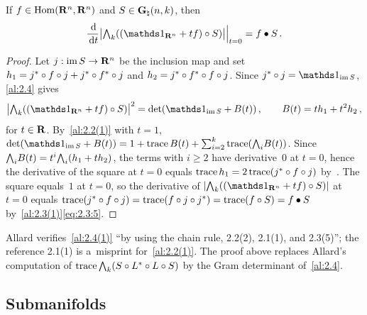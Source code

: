 \begin{lemma}
    \label{al:2.4(1)}
    If $f \in \operatorname{Hom}(\mathbf{R}^{n},\mathbf{R}^{n})$ and $S \in \mathbf{G}_{\natural}(n,k)$, then
    \begin{displaymath}
        \frac{\ud}{\ud t} \big| \extpower{\vdim} ((\id{\R^{\adim}} + t f) \circ S) \big|
        \Big|_{t=0} = f \bullet S \,.
    \end{displaymath}
\end{lemma}

\begin{proof}
    Let $j : \operatorname{im} S \to \mathbf{R}^{n}$ be the inclusion map and set $h_1 = j^{*} \circ f
    \circ j + j^{*} \circ f^{*} \circ j$ and $h_2 = j^{*} \circ
    f^{*} \circ f \circ j$. Since $\transpose{j} \circ j = \id{\im S}$,
    \ref{al:2.4} gives
    \begin{displaymath}
        \big| \extpower{\vdim}((\id{\R^{\adim}} + t f) \circ S) \big|^2 = \det(\id{\im S} + B(t))
        \,, \qquad B(t) = t h_1 + t^2 h_2 \,,
    \end{displaymath}
    for $t \in \mathbf{R}$. By~\ref{al:2.2(1)} with $t = 1$, $\det(\id{\im S} + B(t)) = 1 + \trace B(t) +
    \textsum{i=2}{\vdim} \trace(\extpower{i} B(t))$. Since ${\textstyle\boldsymbol{\bigwedge}}_{{i}} B(t) = t^i
    {\textstyle\boldsymbol{\bigwedge}}_{{i}}(h_1 + t h_2)$, the terms with $i \ge 2$ have derivative~$0$ at $t = 0$, hence
    the derivative of the square at $t = 0$ equals $\operatorname{trace} h_1 = 2 \operatorname{trace}(j^{*} \circ f
    \circ j)$ by~\cite[1.7.6]{Federer1969}. The square equals~$1$ at $t = 0$, so the derivative
    of $|\extpower{\vdim}((\id{\R^{\adim}} + t f) \circ S)|$ at $t = 0$ equals $\operatorname{trace}
    (j^{*} \circ f \circ j) = \operatorname{trace}(f \circ j \circ j^{*}) = \operatorname{trace}(f \circ S) = f
    \bullet S$ by~\ref{al:2.3(1)}\eqref{eq:2.3:5}.
\end{proof}

\begin{remark}
    \label{rem:2.4}
    Allard verifies~\ref{al:2.4(1)} ``by using the chain rule, 2.2(2), 2.1(1), and 2.3(5)''; the
    reference 2.1(1) is a~misprint for~\ref{al:2.2(1)}. The proof above replaces Allard's
    computation of $\operatorname{trace} {\textstyle\boldsymbol{\bigwedge}}_{{k}}(S \circ L^{*} \circ L \circ S)$ by the Gram
    determinant of~\ref{al:2.4}.
\end{remark}

\subsection{Submanifolds}

